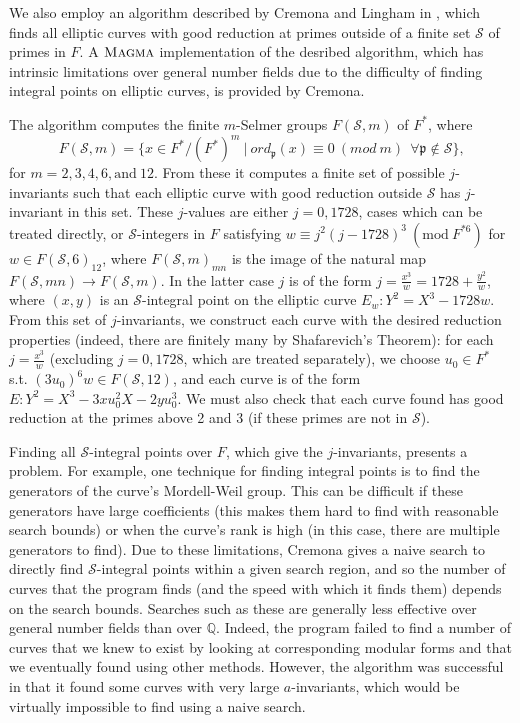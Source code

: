 \documentclass{amsart}
\begin{document}
We also employ an algorithm described by Cremona and Lingham
in \cite{cremona-lingham}, which finds all elliptic curves with good
reduction at primes outside of a finite set $\mathcal{S}$ of primes in
$F$. A $\textsc{Magma}$ implementation of the desribed algorithm, which
has intrinsic limitations over general number fields due to the
difficulty of finding integral points on elliptic curves, is provided by
Cremona.

The algorithm computes the finite $m$-Selmer groups $F(\mathcal{S},m)$ of
$F^*$, where
\begin{equation*}
  F(\mathcal{S},m) = \{x\in F^*/(F^*)^m \ | \ ord_\mathfrak{p}(x) 
    \equiv 0 \ (mod \ m) \ \ \forall \mathfrak{p}\notin \mathcal{S}\}\text{,}
\end{equation*}
for $m = 2, 3, 4, 6, \text{and}\ 12$. From these it computes a finite set of
possible $j$-invariants such that each elliptic curve with good reduction
outside $\mathcal{S}$ has $j$-invariant in this set. These $j$-values are either
$j=0,1728$, cases which can be treated directly, or $\mathcal{S}$-integers in
$F$ satisfying $w \equiv j^2(j-1728)^3 \ (\text{mod} \ F^{*6})$ for
$w\in F(\mathcal{S},6)_{12}$, where $F(\mathcal{S},m)_{mn}$ is the image of the
natural map $F(\mathcal{S},mn) \rightarrow F(\mathcal{S},m)$. In the latter
case $j$ is of the form $j = \frac{x^3}{w} = 1728 + \frac{y^2}{w}$, where
$(x,y)$ is an $\mathcal{S}$-integral point on the elliptic curve
$E_w: Y^2 = X^3 - 1728w$. From this set of $j$-invariants, we construct each
curve with the desired reduction properties (indeed, there are finitely many
by Shafarevich's Theorem): for each $j = \frac{x^3}{w}$ (excluding
$j = 0, 1728$, which are treated separately), we choose $u_0 \in F^*$ s.t.
$(3u_0)^6w \in F(\mathcal{S},12)$, and each curve is of the form
$E: Y^2 = X^3 - 3xu_0^2X - 2yu_0^3$. We must also check that each curve
found has good reduction at the primes above 2 and 3 (if these primes
are not in $\mathcal{S}$).

Finding all $\mathcal{S}$-integral points over $F$, which give the
$j$-invariants, presents a problem. For example, one technique for finding
integral points is to find the generators of the curve's Mordell-Weil group.
This can be difficult if these generators have large coefficients (this makes
them hard to find with reasonable search bounds) or when the curve's rank
is high (in this case, there are multiple generators to find). Due to these
limitations, Cremona gives a naive search to directly find
$\mathcal{S}$-integral points within a given search region, and so the number
of curves that the program finds (and the speed with which it finds them)
depends on the search bounds. Searches such as these are generally less
effective over general number fields than over $\mathbb{Q}$. Indeed, the
program failed to find a number of curves that we knew to exist by looking
at corresponding modular forms and that we eventually found using other
methods. However, the algorithm was successful in that it found some curves
with very large $a$-invariants, which would be virtually impossible to find
using a naive search.
\end{document}
